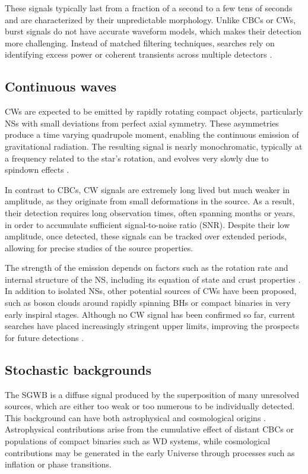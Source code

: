 These signals typically last from a fraction of a second to a few tens of seconds and are characterized by their unpredictable morphology. Unlike CBCs or CWs, burst signals do not have accurate waveform models, which makes their detection more challenging. Instead of matched filtering techniques, searches rely on identifying excess power or coherent transients across multiple detectors \cite{waveburst}.

\subsection{Continuous waves}

CWs are expected to be emitted by rapidly rotating compact objects, particularly NSs with small deviations from perfect axial symmetry. These asymmetries produce a time varying quadrupole moment, enabling the continuous emission of gravitational radiation. The resulting signal is nearly monochromatic, typically at a frequency related to the star’s rotation, and evolves very slowly due to spindown effects \cite{monochromatic_CWs}.

In contrast to CBCs, CW signals are extremely long lived but much weaker in amplitude, as they originate from small deformations in the source. As a result, their detection requires long observation times, often spanning months or years, in order to accumulate sufficient signal-to-noise ratio (SNR). Despite their low amplitude, once detected, these signals can be tracked over extended periods, allowing for precise studies of the source properties.

The strength of the emission depends on factors such as the rotation rate and internal structure of the NS, including its equation of state and crust properties \cite{monochromatic_CWs}. In addition to isolated NSs, other potential sources of CWs have been proposed, such as boson clouds \cite{Boson_clouds_CWs} around rapidly spinning BHs or compact binaries in very early inspiral stages. Although no CW signal has been confirmed so far, current searches have placed increasingly stringent upper limits, improving the prospects for future detections \cite{upper_limits_CW}.


\subsection{Stochastic backgrounds}

The SGWB is a diffuse signal produced by the superposition of many unresolved sources, which are either too weak or too numerous to be individually detected. This background can have both astrophysical and cosmological origins \cite{SGWB}. Astrophysical contributions arise from the cumulative effect of distant CBCs or populations of compact binaries such as WD systems, while cosmological contributions may be generated in the early Universe through processes such as inflation or phase transitions.


